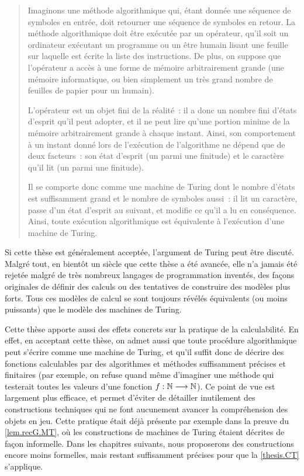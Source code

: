 \begin{quotation}
  Imaginons une méthode algorithmique qui, étant donnée une séquence de symboles
  en entrée, doit retourner une séquence de symboles en retour. La méthode
  algorithmique doit être exécutée par un opérateur, qu'il soit un ordinateur
  exécutant un programme ou un être humain lisant une feuille sur laquelle est
  écrite la liste des instructions. De plus, on suppose que l'opérateur a accès
  à une forme de mémoire arbitrairement grande (une mémoire informatique, ou
  bien simplement un très grand nombre de feuilles de papier pour un humain).

  L'opérateur est un objet fini de la réalité~: il a donc un nombre fini d'états
  d'esprit qu'il peut adopter, et il ne peut lire qu'une portion minime de la
  mémoire arbitrairement grande à chaque instant. Ainsi, son comportement à un
  instant donné lors de l'exécution de l'algorithme ne dépend que de deux
  facteurs~: son état d'esprit (un parmi une finitude) et le caractère qu'il
  lit (un parmi une finitude).

  Il se comporte donc comme une machine de Turing dont le nombre d'états est
  suffisamment grand et le nombre de symboles aussi~: il lit un caractère, passe
  d'un état d'esprit au suivant, et modifie ce qu'il a lu en conséquence. Ainsi,
  toute exécution algorithmique est équivalente à l'exécution d'une machine de
  Turing.
\end{quotation}

Si cette thèse est généralement acceptée, l'argument de Turing peut être
discuté. Malgré tout, en bientôt un siècle que cette thèse a été avancée, elle
n'a jamais été rejetée malgré de très nombreux langages de programmation
inventés, des façons originales de définir des calculs ou des tentatives de
construire des modèles plus forts. Tous ces modèles de calcul se sont toujours
révélés équivalents (ou moins puissants) que le modèle des machines de Turing.

Cette thèse apporte aussi des effets concrets sur la pratique de la
calculabilité.
En effet, en acceptant cette thèse, on admet aussi que toute procédure
algorithmique peut s'écrire comme une machine de Turing, et qu'il suffit donc de
décrire des fonctions calculables par des algorithmes et méthodes
suffisamment précises et finitaires (par exemple, on refuse quand même
d'imaginer une méthode qui testerait toutes les valeurs d'une fonction
$f : \displaystyle \mathbb N \longrightarrow \mathbb N$). Ce point de vue est largement plus efficace, et
permet d'éviter de détailler inutilement des constructions techniques qui ne
font aucunement avancer la compréhension des objets en jeu. Cette pratique était
déjà présente par exemple dans la preuve du \cref{lem.recG.MT}, où les
constructions de machines de Turing étaient décrites de façon informelle.
Dans les chapitres suivants, nous proposerons des constructions encore moins
formelles, mais restant suffisamment précises pour que la \cref{thesis.CT}
s'applique.

